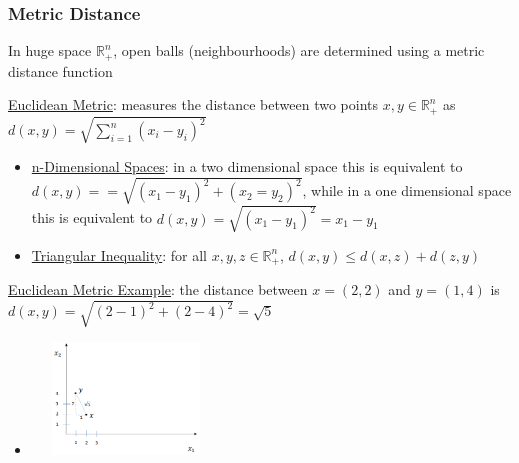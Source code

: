 \documentclass{article}
\begin{document}
\subsubsection{Metric Distance}
In huge space $\mathbb{R}_{+}^{n}$, open balls (neighbourhoods) are determined using a metric distance function \par \vspace{0.3em}
  \underline{Euclidean Metric}: measures the distance between two points $x, y \in \mathbb{R}_{+}^{n}$ as $d(x,y) = \sqrt{\sum_{i=1}^{n}(x_{i}-y_{i})^{2}}$
  \begin{itemize}
    \item  \underline{n-Dimensional Spaces}: in a two dimensional space this is equivalent to $d(x,y) == \sqrt{(x_{1} - y_{1})^{2} + (x_{2} = y_{2})^{2}}$, while in a one dimensional space this is equivalent to $d(x,y) = \sqrt{(x_{1} - y_{1})^{2}} = x_{1} - y_{1}$
    \item  \underline{Triangular Inequality}: for all $x, y, z \in \mathbb{R}_{+}^{n}$, $d(x,y) \leq d(x,z) + d(z,y)$
  \end{itemize}
  \par
  \underline{Euclidean Metric Example}: the distance between $x = (2,2)$ and $y = (1,4)$ is $d(x,y) = \sqrt{(2-1)^{2} + (2-4)^{2}} = \sqrt{5}$
  \begin{itemize}
    \item  \includegraphics[width=5cm, height=3cm]{pic1}
  \end{itemize}
  \par
\vspace{6mm}
\end{document}
